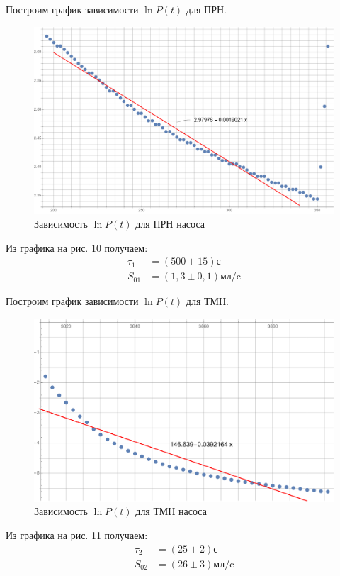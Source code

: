\documentclass[a4paper,12pt]{article}
\theoremstyle{plain} %
\theoremstyle{definition} %
\theoremstyle{remark} %
\begin{document}
Построим график зависимости $\ln P(t)$ для ПРН.
\begin{figure}[H]
	\begin{center}
		\includegraphics[width=0.9\linewidth]{13}
		\caption{Зависимость $\ln P(t)$ для ПРН насоса}
	\end{center}
\end{figure}
Из графика на рис. 10 получаем:
\begin{align*}
\tau_1 &= (500 \pm 15) \text{с}\\
S_{01} &= (1,3\pm 0,1) \text{мл}/\text{c}
\end{align*}

Построим график зависимости $\ln P(t)$ для ТМН.
\begin{figure}[H]
	\begin{center}
		\includegraphics[width=0.9\linewidth]{14}
		\caption{Зависимость $\ln P(t)$ для ТМН насоса}
	\end{center}
\end{figure}
Из графика на рис. 11 получаем:
\begin{align*}
\tau_2 &= (25 \pm 2) \text{с}\\
S_{02} &= (26\pm 3) \text{мл}/\text{c}
\end{align*}
\end{document}
